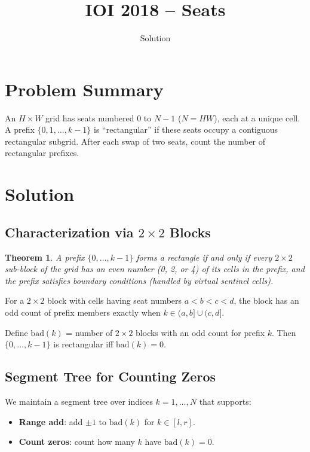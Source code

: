 \documentclass[11pt,a4paper]{article}
\title{IOI 2018 -- Seats}
\author{Solution}
\date{}
\newtheorem{theorem}{Theorem}
\begin{document}
\maketitle

\section{Problem Summary}

An $H \times W$ grid has seats numbered $0$ to $N-1$ ($N = HW$), each at a unique cell. A prefix $\{0, 1, \ldots, k-1\}$ is ``rectangular'' if these seats occupy a contiguous rectangular subgrid. After each swap of two seats, count the number of rectangular prefixes.

\section{Solution}

\subsection{Characterization via $2 \times 2$ Blocks}

\begin{theorem}
A prefix $\{0, \ldots, k-1\}$ forms a rectangle if and only if every $2 \times 2$ sub-block of the grid has an even number (0, 2, or 4) of its cells in the prefix, \emph{and} the prefix satisfies boundary conditions (handled by virtual sentinel cells).
\end{theorem}

For a $2 \times 2$ block with cells having seat numbers $a < b < c < d$, the block has an odd count of prefix members exactly when $k \in (a, b] \cup (c, d]$.

Define $\text{bad}(k)$ = number of $2 \times 2$ blocks with an odd count for prefix $k$. Then $\{0, \ldots, k-1\}$ is rectangular iff $\text{bad}(k) = 0$.

\subsection{Segment Tree for Counting Zeros}

We maintain a segment tree over indices $k = 1, \ldots, N$ that supports:
\begin{itemize}
  \item \textbf{Range add}: add $\pm 1$ to $\text{bad}(k)$ for $k \in [l, r]$.
  \item \textbf{Count zeros}: count how many $k$ have $\text{bad}(k) = 0$.
\end{itemize}
\end{document}
